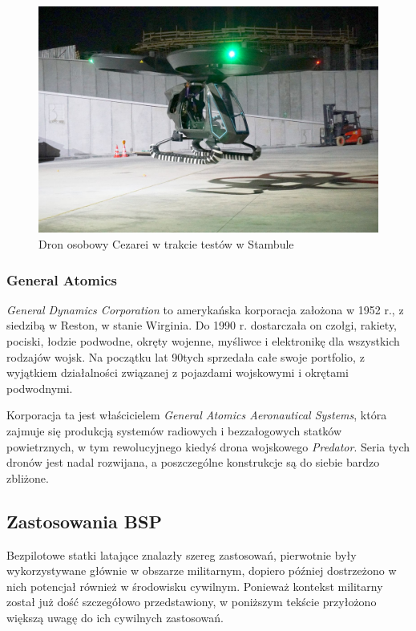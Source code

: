 \begin{figure}[!h]
  \centering
  \includegraphics[width=12cm]{./Obrazy/cezarei.jpg}
  \caption{Dron osobowy Cezarei w trakcie testów w Stambule}
  \end{figure}

\subsubsection{General Atomics}
\textit{General Dynamics Corporation} to amerykańska korporacja założona w 1952 r., z siedzibą w Reston, w stanie Wirginia. Do 1990 r. dostarczała on czołgi, rakiety, pociski, łodzie podwodne, okręty wojenne, myśliwce i elektronikę dla wszystkich rodzajów wojsk. Na początku lat 90tych sprzedała całe swoje portfolio, z wyjątkiem działalności związanej z pojazdami wojskowymi i okrętami podwodnymi.

Korporacja ta jest właścicielem \textit{General Atomics Aeronautical Systems}, która zajmuje się produkcją systemów radiowych i bezzałogowych statków powietrznych, w tym rewolucyjnego kiedyś drona wojskowego \textit{Predator}. Seria tych dronów jest nadal rozwijana, a poszczególne konstrukcje są do siebie bardzo zbliżone.\cite{gd-about}\cite{wiki-gaas}

\subsection{Zastosowania BSP}
Bezpilotowe statki latające znalazły szereg zastosowań, pierwotnie były wykorzystywane głównie w obszarze militarnym, dopiero później dostrzeżono w nich potencjał również w środowisku cywilnym. Ponieważ kontekst militarny został już dość szczegółowo przedstawiony, w poniższym tekście przyłożono większą uwagę do ich cywilnych zastosowań.

